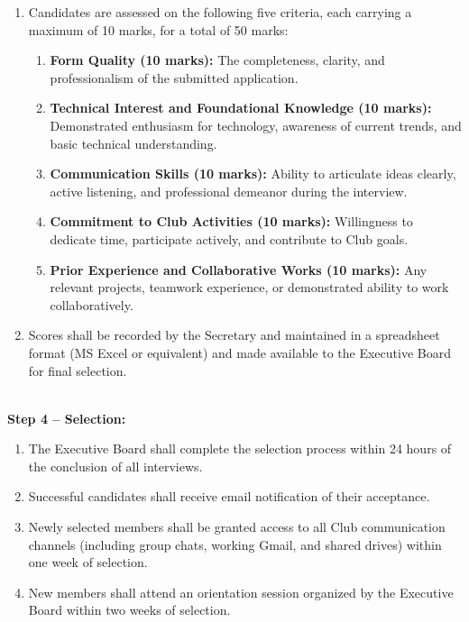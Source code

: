 \begin{enumerate}[label=\alph*), leftmargin=2em, itemsep=0.3em]
    \item Candidates are assessed on the following five criteria, each carrying a maximum of 10 marks, for a total of 50 marks:
    \begin{enumerate}[label=\arabic*. , leftmargin=2em, itemsep=0.2em]
        \item \textbf{Form Quality (10 marks):} The completeness, clarity, and professionalism of the submitted application.
        \item \textbf{Technical Interest and Foundational Knowledge (10 marks):} Demonstrated enthusiasm for technology, awareness of current trends, and basic technical understanding.
        \item \textbf{Communication Skills (10 marks):} Ability to articulate ideas clearly, active listening, and professional demeanor during the interview.
        \item \textbf{Commitment to Club Activities (10 marks):} Willingness to dedicate time, participate actively, and contribute to Club goals.
        \item \textbf{Prior Experience and Collaborative Works (10 marks):} Any relevant projects, teamwork experience, or demonstrated ability to work collaboratively.
    \end{enumerate}
    \item Scores shall be recorded by the Secretary and maintained in a spreadsheet format (MS Excel or equivalent) and made available to the Executive Board for final selection.
\end{enumerate}
\\
\textbf{Step 4 -- Selection:}
\begin{enumerate}[label=\alph*), leftmargin=2em, itemsep=0.3em]
    \item The Executive Board shall complete the selection process within 24 hours of the conclusion of all interviews.
    \item Successful candidates shall receive email notification of their acceptance.
    \item Newly selected members shall be granted access to all Club communication channels (including group chats, working Gmail, and shared drives) within one week of selection.
    \item New members shall attend an orientation session organized by the Executive Board within two weeks of selection.
\end{enumerate}

